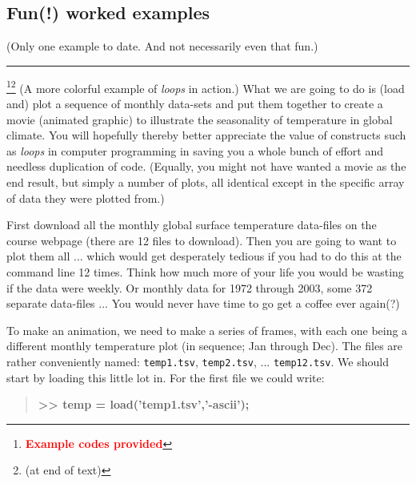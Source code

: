 \documentclass{tufte-book} %
\newenvironment{docspecbold}{\begin{quotation}\ttfamily\bfseries\parskip0pt\parindent0pt\ignorespaces}{\end{quotation}}
\begin{document}

\subsection{Fun(!) worked examples}

(Only one example to date. And not necessarily even that fun.)

\vspace{1mm}
\noindent\rule{4cm}{0.5pt}
\vspace{-2mm}

\footnote{\textcolor{red}{\textbf{Example codes provided}}}\footnote{(at end of text)} (A more colorful example of \textit{loops} in action.) What we are going to do is (load and) plot a sequence of monthly data-sets and put them together to create a movie (animated graphic) to illustrate the seasonality of temperature in global climate. You will hopefully thereby better appreciate the value of constructs such as \textit{loops} in computer programming in saving you a whole bunch of effort and needless duplication of code. (Equally, you might not have wanted a movie as the end result, but simply a number of plots, all identical except in the specific array of data they were plotted from.)

First download all the monthly global surface temperature data-files on the  course webpage (there are 12 files to download). Then you are going to want to plot them all ... which would get desperately tedious if you had to do this at the command line 12 times. Think how much more of your life you would be wasting if the data were weekly. Or monthly data for 1972 through 2003, some 372 separate data-files ... You would never have time to go get a coffee ever again(?)

To make an animation, we need to make a series of frames, with each one being a different monthly temperature plot (in sequence; Jan through Dec). The files are rather conveniently named: \texttt{temp1.tsv}, \texttt{temp2.tsv}, ... \texttt{temp12.tsv}. We should start by loading this little lot in. For the first file we could write:

\begin{docspecbold}
>> temp = load('temp1.tsv','-ascii');
\end{docspecbold}
\end{document}
